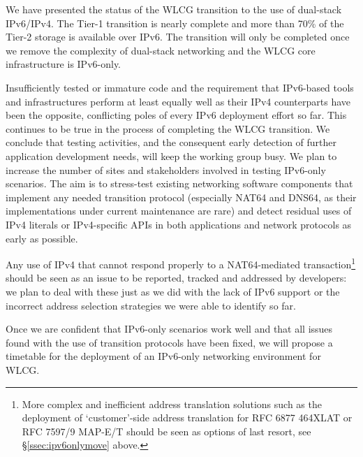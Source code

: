 
We have presented the status of the WLCG transition to the use of dual-stack IPv6/IPv4. The Tier-1 transition is nearly complete and 
more than 70\% of the Tier-2 storage is available over IPv6. The transition will only be completed once we remove the complexity of
dual-stack networking and the WLCG core infrastructure is IPv6-only.


Insufficiently tested or immature code and the requirement that IPv6-based
tools and infrastructures perform at least equally well as their IPv4
counterparts have been the opposite, conflicting poles of every IPv6
deployment effort so far. This continues to be true in the process
of completing the WLCG transition. We conclude that
testing activities, and the consequent early detection of further application
development needs, will keep the working group busy. We plan
to increase the number of sites and stakeholders involved in testing IPv6-only 
scenarios. The aim is to stress-test existing networking software components
that implement any needed transition protocol (especially NAT64 and DNS64, as 
their implementations under current maintenance are rare) and detect
residual uses of IPv4 literals or IPv4-specific APIs in both applications and
network protocols as early as possible.\par
Any use of IPv4 that cannot respond properly to a NAT64-mediated
transaction\footnote{More complex and inefficient address
translation solutions such as the deployment of `customer'-side address
translation for RFC 6877 \cite{rfc} 464XLAT or RFC 7597/9 \cite{rfc} MAP-E/T  should be
seen as options of last resort, see \S \ref{ssec:ipv6onlymove} above.}
should be seen as an issue to be reported, tracked and
addressed by developers: we plan to deal with these just as we did
with the lack of IPv6 support or the incorrect address selection
strategies we were able to identify so far.\par
Once we are confident that IPv6-only scenarios work well and that
all issues found with the use of transition protocols have been fixed, we will
propose a timetable for the deployment of an IPv6-only networking 
environment for WLCG.
